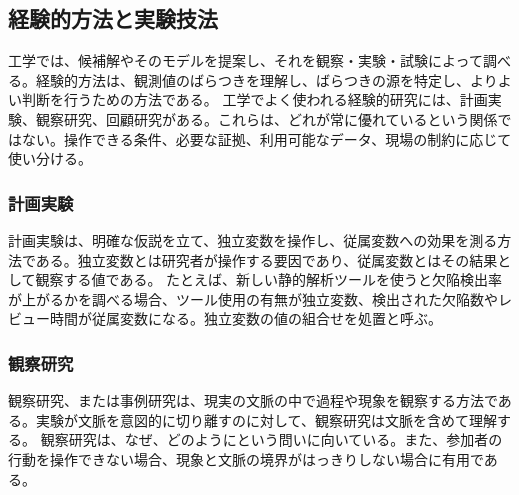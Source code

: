 \subsection{経験的方法と実験技法}
工学では、候補解やそのモデルを提案し、それを観察・実験・試験によって調べる。経験的方法は、観測値のばらつきを理解し、ばらつきの源を特定し、よりよい判断を行うための方法である。
工学でよく使われる経験的研究には、計画実験、観察研究、回顧研究がある。これらは、どれが常に優れているという関係ではない。操作できる条件、必要な証拠、利用可能なデータ、現場の制約に応じて使い分ける。
\subsubsection{計画実験}
計画実験は、明確な仮説を立て、独立変数を操作し、従属変数への効果を測る方法である。独立変数とは研究者が操作する要因であり、従属変数とはその結果として観察する値である。
たとえば、新しい静的解析ツールを使うと欠陥検出率が上がるかを調べる場合、ツール使用の有無が独立変数、検出された欠陥数やレビュー時間が従属変数になる。独立変数の値の組合せを処置と呼ぶ。
\subsubsection{観察研究}
観察研究、または事例研究は、現実の文脈の中で過程や現象を観察する方法である。実験が文脈を意図的に切り離すのに対して、観察研究は文脈を含めて理解する。
観察研究は、なぜ、どのようにという問いに向いている。また、参加者の行動を操作できない場合、現象と文脈の境界がはっきりしない場合に有用である。

